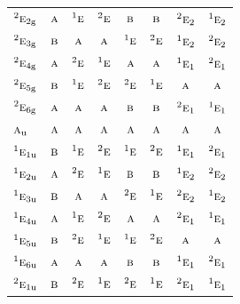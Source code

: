 \documentclass[10pt,a4paper]{article}
\numberwithin{equation}{section}
\newcommand{\irr}[1]{\text{\normalfont\scshape #1}}
\newcommand{\conjpair}[1]{{}^{#1}}
\newcommand{\ptag}[1]{\mathrm{#1}}
\begin{document}
{\begin{longtable}{@{}lccccccc@{}}
$\conjpair{2}\irr{e}_{2\ptag{g}}$ & $\irr{a}$ & $\conjpair{1}\irr{e}$ & $\conjpair{2}\irr{e}$ & $\irr{b}$ & $\irr{b}$ & $\conjpair{2}\irr{e}_{2}$ & $\conjpair{1}\irr{e}_{2}$\\
$\conjpair{2}\irr{e}_{3\ptag{g}}$ & $\irr{b}$ & $\irr{a}$ & $\irr{a}$ & $\conjpair{1}\irr{e}$ & $\conjpair{2}\irr{e}$ & $\conjpair{1}\irr{e}_{2}$ & $\conjpair{2}\irr{e}_{2}$\\
$\conjpair{2}\irr{e}_{4\ptag{g}}$ & $\irr{a}$ & $\conjpair{2}\irr{e}$ & $\conjpair{1}\irr{e}$ & $\irr{a}$ & $\irr{a}$ & $\conjpair{1}\irr{e}_{1}$ & $\conjpair{2}\irr{e}_{1}$\\
$\conjpair{2}\irr{e}_{5\ptag{g}}$ & $\irr{b}$ & $\conjpair{1}\irr{e}$ & $\conjpair{2}\irr{e}$ & $\conjpair{2}\irr{e}$ & $\conjpair{1}\irr{e}$ & $\irr{a}$ & $\irr{a}$\\
$\conjpair{2}\irr{e}_{6\ptag{g}}$ & $\irr{a}$ & $\irr{a}$ & $\irr{a}$ & $\irr{b}$ & $\irr{b}$ & $\conjpair{2}\irr{e}_{1}$ & $\conjpair{1}\irr{e}_{1}$\\
$\irr{a}_{\ptag{u}}$ & $\irr{a}$ & $\irr{a}$ & $\irr{a}$ & $\irr{a}$ & $\irr{a}$ & $\irr{a}$ & $\irr{a}$\\
$\conjpair{1}\irr{e}_{1\ptag{u}}$ & $\irr{b}$ & $\conjpair{1}\irr{e}$ & $\conjpair{2}\irr{e}$ & $\conjpair{1}\irr{e}$ & $\conjpair{2}\irr{e}$ & $\conjpair{1}\irr{e}_{1}$ & $\conjpair{2}\irr{e}_{1}$\\
$\conjpair{1}\irr{e}_{2\ptag{u}}$ & $\irr{a}$ & $\conjpair{2}\irr{e}$ & $\conjpair{1}\irr{e}$ & $\irr{b}$ & $\irr{b}$ & $\conjpair{1}\irr{e}_{2}$ & $\conjpair{2}\irr{e}_{2}$\\
$\conjpair{1}\irr{e}_{3\ptag{u}}$ & $\irr{b}$ & $\irr{a}$ & $\irr{a}$ & $\conjpair{2}\irr{e}$ & $\conjpair{1}\irr{e}$ & $\conjpair{2}\irr{e}_{2}$ & $\conjpair{1}\irr{e}_{2}$\\
$\conjpair{1}\irr{e}_{4\ptag{u}}$ & $\irr{a}$ & $\conjpair{1}\irr{e}$ & $\conjpair{2}\irr{e}$ & $\irr{a}$ & $\irr{a}$ & $\conjpair{2}\irr{e}_{1}$ & $\conjpair{1}\irr{e}_{1}$\\
$\conjpair{1}\irr{e}_{5\ptag{u}}$ & $\irr{b}$ & $\conjpair{2}\irr{e}$ & $\conjpair{1}\irr{e}$ & $\conjpair{1}\irr{e}$ & $\conjpair{2}\irr{e}$ & $\irr{a}$ & $\irr{a}$\\
$\conjpair{1}\irr{e}_{6\ptag{u}}$ & $\irr{a}$ & $\irr{a}$ & $\irr{a}$ & $\irr{b}$ & $\irr{b}$ & $\conjpair{1}\irr{e}_{1}$ & $\conjpair{2}\irr{e}_{1}$\\
$\conjpair{2}\irr{e}_{1\ptag{u}}$ & $\irr{b}$ & $\conjpair{2}\irr{e}$ & $\conjpair{1}\irr{e}$ & $\conjpair{2}\irr{e}$ & $\conjpair{1}\irr{e}$ & $\conjpair{2}\irr{e}_{1}$ & $\conjpair{1}\irr{e}_{1}$\\

\end{longtable}}
\end{document}
